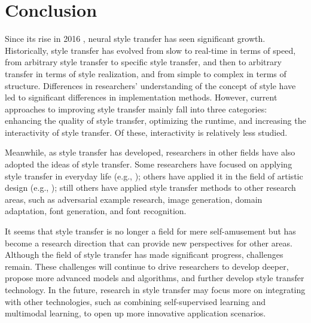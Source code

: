 \documentclass[preprint,12pt]{elsarticle}
\begin{document}
\section{Conclusion}

Since its rise in 2016\citep{02gatys2016image} , neural style transfer has seen significant growth. Historically, style transfer has evolved from slow to real-time in terms of speed, from arbitrary style transfer to specific style transfer, and then to arbitrary transfer in terms of style realization, and from simple to complex in terms of structure. Differences in researchers' understanding of the concept of style have led to significant differences in implementation methods. However, current approaches to improving style transfer mainly fall into three categories: enhancing the quality of style transfer, optimizing the runtime, and increasing the interactivity of style transfer. Of these, interactivity is relatively less studied.

Meanwhile, as style transfer has developed, researchers in other fields have also adopted the ideas of style transfer. Some researchers have focused on applying style transfer in everyday life (e.g., \citep{05ke2023neural,15gunawan2023modernizing}); others have applied it in the field of artistic design (e.g., \citep{10liu2021self,11bae2023unsupervised,12hollein2022stylemesh,13yin20213dstylenet,14yang2022industrial}); still others have applied style transfer methods to other research areas, such as adversarial example research\citep{08liu2021psgan++,09xu2022transeditor}, image generation\citep{19karras2019style}, domain adaptation\citep{20guan2022cdtnet}, font generation\citep{06fu2023neural}, and font recognition\citep{07tang2022few}.

It seems that style transfer is no longer a field for mere self-amusement but has become a research direction that can provide new perspectives for other areas. Although the field of style transfer has made significant progress, challenges remain. These challenges will continue to drive researchers to develop deeper, propose more advanced models and algorithms, and further develop style transfer technology. In the future, research in style transfer may focus more on integrating with other technologies, such as combining self-supervised learning and multimodal learning, to open up more innovative application scenarios.



% 







  
\end{document}
